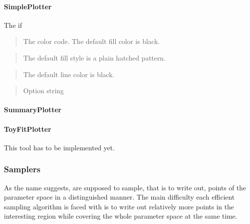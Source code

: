 \documentclass[letterpaper,10pt,english]{sphinxmanual}
\begin{document}
\paragraph{SimplePlotter}
\label{simple_plotter::doc}\label{simple_plotter:simpleplotter}
The if

\begin{quote}

The color code. The default fill color is black.
\end{quote}

\begin{quote}

The default fill style is a plain hatched pattern.
\end{quote}

\begin{quote}

The default line color is black.
\end{quote}

\begin{quote}

Option string
\end{quote}


\paragraph{SummaryPlotter}
\label{summary_plotter:summaryplotter}\label{summary_plotter::doc}






\paragraph{ToyFitPlotter}
\label{toyfit_plotter:toyfitplotter}\label{toyfit_plotter::doc}
This tool has to be implemented yet.


\subsubsection{Samplers}
\label{samplers:samplers}\label{samplers::doc}
As the name suggests,  are supposed to sample, that is to write out, points of the
parameter space in a distinguished manner. The main difficulty each efficient sampling algorithm is
faced with is to write out relatively more points in the interesting region while covering the whole
parameter space at the same time.
\end{document}
